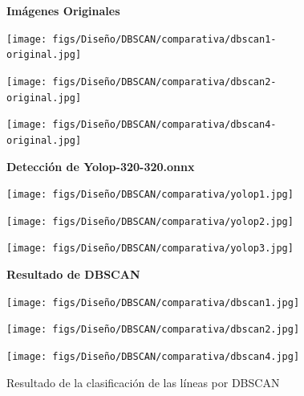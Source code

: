 \begin{figure}[H]
  \centering

  \textbf{Imágenes Originales}
  \vspace{0.5cm}

  \begin{minipage}[t]{0.3\textwidth}
      \centering
      \texttt{[image: figs/Diseño/DBSCAN/comparativa/dbscan1-original.jpg]}
      \caption*{}
  \end{minipage}
  \hfill
  \begin{minipage}[t]{0.3\textwidth}
      \centering
      \texttt{[image: figs/Diseño/DBSCAN/comparativa/dbscan2-original.jpg]}
      \caption*{}
  \end{minipage}
  \hfill
  \begin{minipage}[t]{0.3\textwidth}
      \centering
      \texttt{[image: figs/Diseño/DBSCAN/comparativa/dbscan4-original.jpg]}
      \caption*{}
  \end{minipage}

  \vspace{0.5cm}

  \textbf{Detección de Yolop-320-320.onnx}
  \vspace{0.5cm}

  \begin{minipage}[t]{0.3\textwidth}
      \centering
      \texttt{[image: figs/Diseño/DBSCAN/comparativa/yolop1.jpg]}
      \caption*{}
  \end{minipage}
  \hfill
  \begin{minipage}[t]{0.3\textwidth}
      \centering
      \texttt{[image: figs/Diseño/DBSCAN/comparativa/yolop2.jpg]}
      \caption*{}
  \end{minipage}
  \hfill
  \begin{minipage}[t]{0.3\textwidth}
      \centering
      \texttt{[image: figs/Diseño/DBSCAN/comparativa/yolop3.jpg]}
      \caption*{}
  \end{minipage}

  \vspace{0.5cm}

  \textbf{Resultado de DBSCAN}
  \vspace{0.5cm}

  \begin{minipage}[t]{0.3\textwidth}
      \centering
      \texttt{[image: figs/Diseño/DBSCAN/comparativa/dbscan1.jpg]}
      \caption*{}
  \end{minipage}
  \hfill
  \begin{minipage}[t]{0.3\textwidth}
      \centering
      \texttt{[image: figs/Diseño/DBSCAN/comparativa/dbscan2.jpg]}
      \caption*{}
  \end{minipage}
  \hfill
  \begin{minipage}[t]{0.3\textwidth}
      \centering
      \texttt{[image: figs/Diseño/DBSCAN/comparativa/dbscan4.jpg]}
      \caption*{}
  \end{minipage}

  \caption{Resultado de la clasificación de las líneas por DBSCAN}
  \label{clasificación}
\end{figure}

